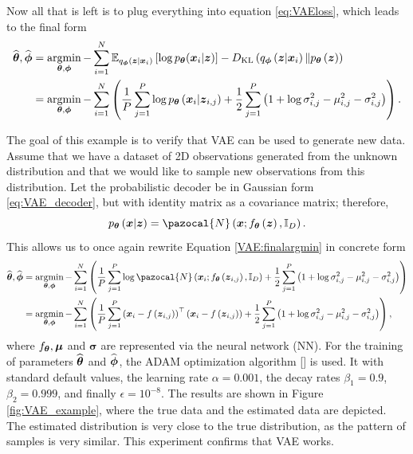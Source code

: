 Now all that is left is to plug everything into equation \eqref{eq:VAEloss}, which leads to the final form
\begin{align}\label{řešení_VAE}
 \widehat{\boldsymbol{\theta}}, \widehat{\boldsymbol{\phi}} & = \mathop{\mathrm{argmin}}_{\boldsymbol{\theta},\boldsymbol{\phi}}-\sum_{i=1}^N\mathbb{E}_{q_{\boldsymbol{\phi}}\left(\boldsymbol{z}\vert \boldsymbol{x}_i \right)}\left[\log p_{\boldsymbol{\theta}}(\boldsymbol{x}_i\vert \boldsymbol{z}) \right] - D_{\mathrm{KL}}\left(q_{\boldsymbol{\phi}}\left(\boldsymbol{z}\vert\boldsymbol{x}_i \right) \Vert p_{\boldsymbol{\theta}}\left(\boldsymbol{z}\right)\right) \\ \label{VAE:finalargmin}
 & = \mathop{\mathrm{argmin}}_{\boldsymbol{\theta}, \boldsymbol{\phi}}-\sum_{i = 1}^N\left(\frac{1}{P}\sum_{j = 1}^P \log p_{\boldsymbol{\theta}}\left(\boldsymbol{x}_i\vert \boldsymbol{z}_{i,j}\right) +   \frac{1}{2}\sum_{j=1}^P\left(1 + \log\sigma^2_{i,j} -\mu_{i,j}^2 -\sigma_{i,j}^2 \right)\right).
\end{align}

\begin{example}
The goal of this example is to verify that VAE can be used to generate new data. Assume that we have a dataset of 2D observations generated from the unknown distribution and that we would like to sample new observations from this distribution. Let the probabilistic decoder be in Gaussian form \ref{eq:VAE_decoder}, but with identity matrix as a covariance matrix; therefore,
\begin{equation}
p_{\bt}\left(\bx\vert\boldsymbol{z}\right) = \pazocal{N}\left(\boldsymbol{x};f_{\bt}\left(\boldsymbol{z}\right),\mathbb{I}_D \right).
\end{equation}
This allows us to once again rewrite Equation \eqref{VAE:finalargmin} in concrete form
\begin{align}
  \widehat{\bt}, \widehat{\bphi}  &=\argmin_{\bt, \bphi}-\sum_{i = 1}^N\left(\frac{1}{P}\sum_{j = 1}^P \log \pazocal{N}\left(\boldsymbol{x}_i;f_{\bt}\left(\boldsymbol{z}_{i,j}\right),\mathbb{I}_D \right) +   \frac{1}{2}\sum_{j=1}^P\left(1 + \log\sigma^2_{i,j} -\mu_{i,j}^2 -\sigma_{i,j}^2 \right)\right) \\
  &=\argmin_{\bt, \bphi}-\sum_{i = 1}^N\left(\frac{1}{P}\sum_{j = 1}^P \left(\bx_i -f\left(\bz_{i,j} \right)\right)^\top\left(\bx_i -f\left(\bz_{i,j} \right)\right)+   \frac{1}{2}\sum_{j=1}^P\left(1 + \log\sigma^2_{i,j} -\mu_{i,j}^2 -\sigma_{i,j}^2 \right)\right),
\end{align}
where $f_{\boldsymbol{\theta}}, \boldsymbol{\mu}$ and $\boldsymbol{\sigma}$ are represented via the neural network (NN). For the training of parameters $\widehat{\boldsymbol{\theta}}$ and $\widehat{\boldsymbol{\phi}}$, the ADAM optimization algorithm [] is used. It  with standard default values, the learning rate $\alpha =0.001$, the decay rates $\beta_1=0.9$, $\beta_2=0.999$, and finally $\epsilon =10^{-8}$. The results are shown in Figure \ref{fig:VAE_example}, where the true data and the estimated data are depicted. The estimated distribution is very close to the true distribution, as the pattern of samples is very similar. This experiment confirms that VAE works.

\end{example}
